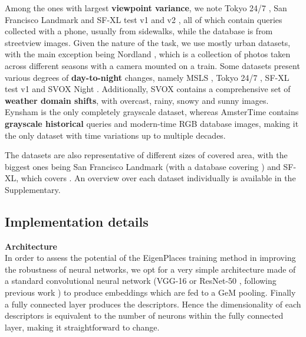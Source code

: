 \documentclass[10pt,twocolumn,letterpaper]{article}
\newcommand{\myparagraph}[1]{\vspace{4pt}\noindent\textbf{#1}}
\begin{document}
Among the ones with largest \textbf{viewpoint variance}, we note Tokyo 24/7 \cite{Torii_2018_tokyo247}, San Francisco Landmark \cite{Chen_2011_san_francisco} and SF-XL test v1 and v2 \cite{Berton_2022_cosPlace}, all of which contain queries collected with a phone, usually from sidewalks, while the database is from streetview images.
Given the nature of the task, we use mostly urban datasets, with the main exception being Nordland \cite{Sunderhauf_2013_nordland}, which is a collection of photos taken across different seasons with a camera mounted on a train.
Some datasets present various degrees of \textbf{day-to-night} changes, namely MSLS \cite{Warburg_2020_msls}, Tokyo 24/7 \cite{Torii_2018_tokyo247}, SF-XL test v1 \cite{Berton_2022_cosPlace} and SVOX Night \cite{Berton_2021_svox}.
Additionally, SVOX contains a comprehensive set of \textbf{weather domain shifts}, with overcast, rainy, snowy and sunny images.
Eynsham \cite{Cummins_2009_eynsham} is the only completely grayscale dataset, whereas AmsterTime \cite{Yildiz_2022_AmsterTime} contains \textbf{grayscale historical} queries and modern-time RGB database images, making it the only dataset with time variations up to multiple decades.

The datasets are also representative of different sizes of covered area, with the biggest ones being San Francisco Landmark \cite{Chen_2011_san_francisco} (with a database covering ) and SF-XL, which covers .
An overview over each dataset individually is available in the Supplementary.



\subsection{Implementation details}

\myparagraph{Architecture} \\
In order to assess the potential of the EigenPlaces training method in improving the robustness of neural networks, we opt for a very simple architecture made of a standard convolutional neural network (VGG-16 \cite{Simonyan_2015_vgg} or ResNet-50 \cite{He_2016_resnet}, following previous work \cite{Arandjelovic_2018_netvlad, Kim_2017_crn, Liu_2019_sare, Ge_2020_sfrs, Berton_2022_cosPlace, Alibey_2022_gsvcities, Alibey_2023_mixvpr}) to produce embeddings which are fed to a GeM \cite{Radenovic_2019_gem} pooling. Finally a fully connected layer produces the descriptors.
Hence the dimensionality of each descriptors is  equivalent to the number of neurons within the fully connected layer, making it straightforward to change.
\end{document}
